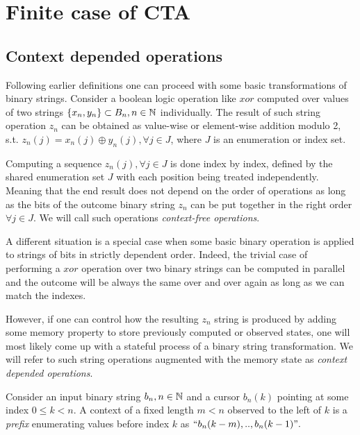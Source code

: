 \pagebreak
\section{Finite case of CTA}

\subsection{Context depended operations}

Following earlier definitions one can proceed with some basic transformations of binary strings. Consider a boolean logic operation like $xor$ computed over values of two strings $\{x_n, y_n\} \subset B_n, n \in \mathbb{N}$ individually. The result of such string operation $z_n$ can be obtained as value-wise or element-wise addition modulo 2, s.t. $z_n(j) = x_n(j) \oplus y_n(j), \forall j \in J $, where $J$ is an enumeration or index set. 

Computing a sequence $z_n(j), \forall j \in J$ is done index by index, defined by the shared enumeration set $J$ with each position being treated independently. Meaning that the end result does not depend on the order of operations as long as the bits of the outcome binary string $z_n$ can be put together in the right order $\forall j \in J$. We will call such operations \textit{context-free operations}. 

A different situation is a special case when some basic binary operation is applied to strings of bits in strictly dependent order. Indeed, the trivial case of performing a $xor$ operation over two binary strings can be computed in parallel and the outcome will be always the same over and over again as long as we can match the indexes. 

However, if one can control how the resulting $z_n$ string is produced by adding some memory property to store previously computed or observed states, one will most likely come up with a stateful process of a binary string transformation. We will refer to such string operations augmented with the memory state as \textit{context depended operations}.

\begin{definition}\label{def_cursor}
  Consider an input binary string $b_n, n \in \mathbb{N}$ and a cursor $b_n(k)$ pointing at some index $0 \leq k < n$. A context of a fixed length $m < n$ observed to the left of $k$ is a \textit{prefix} enumerating values before index $k$ as $\text{``} b_n(k-m),..,b_n(k-1)\text{''}.$
\end{definition}

